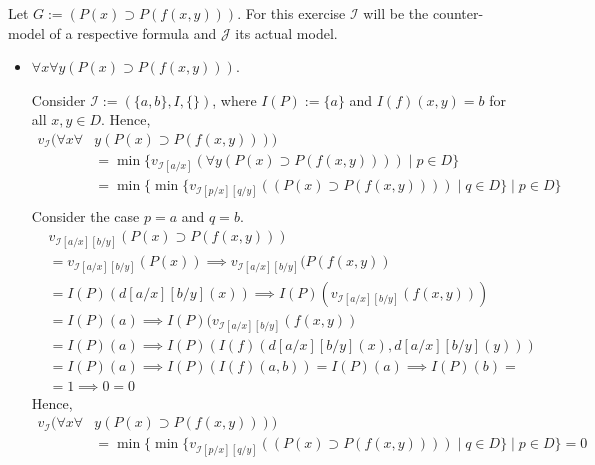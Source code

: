 \documentclass[11pt,a4paper]{article}
\begin{document}
Let $G:= (P(x) \supset P(f(x,y)))$. For this exercise $\mathcal{I}$ will be the counter-model of a respective formula and $\mathcal{J}$ its actual model.
\begin{itemize}
\item $\forall x \forall  y (P(x) \supset P(f(x,y)))$. 

Consider $\mathcal{I}:=(\{a,b\}, I, \{\})$, where $I(P):=\{a\}$ and $I(f)(x,y)=b$ for all $x,y \in D$.
Hence,
\begin{equation*}
\begin{split}
v_{\mathcal{I}}(\forall x \forall  &y (P(x) \supset P(f(x,y)))) \\
&=\min \{v_{\mathcal{I}[a/x]}( \forall  y (P(x) \supset P(f(x,y))))  \mid  p \in D\}\\
&=\min \{\min \{v_{\mathcal{I}[p/x][q/y]}((P(x) \supset P(f(x,y))))  \mid  q \in D\} \mid  p \in D\} \\
\end{split}
\end{equation*}
Consider the case $p=a$ and $q=b$.
\begin{equation*}
\begin{split}
&v_{\mathcal{I}[a/x][b/y]}(P(x) \supset P(f(x,y)))\\ 
&=v_{\mathcal{I}[a/x][b/y]}(P(x)) \implies v_{\mathcal{I}[a/x][b/y]}(P(f(x,y)) \\
&=I(P)(d[a/x][b/y](x)) \implies I(P)(v_{\mathcal{I}[a/x][b/y]}(f(x,y))) \\
&=I(P)(a) \implies I(P)(v_{\mathcal{I}[a/x][b/y]}(f(x,y)) \\
&=I(P)(a) \implies I(P)(I(f)(d[a/x][b/y](x),d[a/x][b/y](y))) \\
&=I(P)(a) \implies I(P)(I(f)(a,b)) = I(P)(a) \implies I(P)(b) = \\
&= 1 \implies 0 = 0
\end{split}
\end{equation*}
Hence, 
\begin{equation*}
\begin{split}
v_{\mathcal{I}}(\forall x \forall  &y (P(x) \supset P(f(x,y)))) \\
&=\min \{\min \{v_{\mathcal{I}[p/x][q/y]}((P(x) \supset P(f(x,y))))  \mid  q \in D\} \mid  p \in D\} =0\\
\end{split}
\end{equation*}




\end{itemize}
\end{document}

